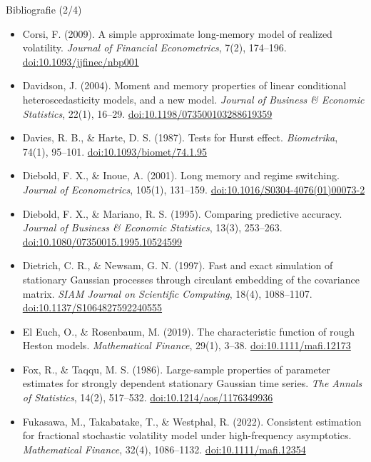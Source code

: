 \begin{frame}{Bibliografie (2/4)}
\itemsize{\tiny}
\begin{itemize}
    \item Corsi, F. (2009). A simple approximate long-memory model of realized volatility. \textit{Journal of Financial Econometrics}, 7(2), 174--196. \href{https://doi.org/10.1093/jjfinec/nbp001}{doi:10.1093/jjfinec/nbp001}
    \item Davidson, J. (2004). Moment and memory properties of linear conditional heteroscedasticity models, and a new model. \textit{Journal of Business \& Economic Statistics}, 22(1), 16--29. \href{https://doi.org/10.1198/073500103288619359}{doi:10.1198/073500103288619359}
    \item Davies, R. B., \& Harte, D. S. (1987). Tests for Hurst effect. \textit{Biometrika}, 74(1), 95--101. \href{https://doi.org/10.1093/biomet/74.1.95}{doi:10.1093/biomet/74.1.95}
    \item Diebold, F. X., \& Inoue, A. (2001). Long memory and regime switching. \textit{Journal of Econometrics}, 105(1), 131--159. \href{https://doi.org/10.1016/S0304-4076(01)00073-2}{doi:10.1016/S0304-4076(01)00073-2}
    \item Diebold, F. X., \& Mariano, R. S. (1995). Comparing predictive accuracy. \textit{Journal of Business \& Economic Statistics}, 13(3), 253--263. \href{https://doi.org/10.1080/07350015.1995.10524599}{doi:10.1080/07350015.1995.10524599}
    \item Dietrich, C. R., \& Newsam, G. N. (1997). Fast and exact simulation of stationary Gaussian processes through circulant embedding of the covariance matrix. \textit{SIAM Journal on Scientific Computing}, 18(4), 1088--1107. \href{https://doi.org/10.1137/S1064827592240555}{doi:10.1137/S1064827592240555}
    \item El Euch, O., \& Rosenbaum, M. (2019). The characteristic function of rough Heston models. \textit{Mathematical Finance}, 29(1), 3--38. \href{https://doi.org/10.1111/mafi.12173}{doi:10.1111/mafi.12173}
    \item Fox, R., \& Taqqu, M. S. (1986). Large-sample properties of parameter estimates for strongly dependent stationary Gaussian time series. \textit{The Annals of Statistics}, 14(2), 517--532. \href{https://doi.org/10.1214/aos/1176349936}{doi:10.1214/aos/1176349936}
    \item Fukasawa, M., Takabatake, T., \& Westphal, R. (2022). Consistent estimation for fractional stochastic volatility model under high-frequency asymptotics. \textit{Mathematical Finance}, 32(4), 1086--1132. \href{https://doi.org/10.1111/mafi.12354}{doi:10.1111/mafi.12354}

\end{itemize}
\end{frame}
